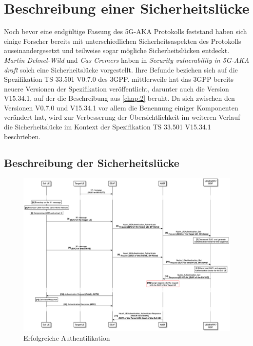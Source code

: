 \chapter{Beschreibung einer Sicherheitsl\"ucke}
\label{chap:4}

Noch bevor eine endgültige Fassung des 5G-AKA Protokolls feststand haben sich einige Forscher bereits mit unterschiedlichen Sicherheitsaspekten des Protokolls auseinandergesetzt und teilweise sogar mögliche Sicherheitslücken entdeckt.
\textit{Martin Dehnel-Wild} und \textit{Cas Cremers} haben in \textit{Security vulnerability in 5G-AKA draft} solch eine Sicherheitslücke vorgestellt. %
Ihre Befunde beziehen sich auf die Spezifikation TS 33.501 V0.7.0 des 3GPP. %
mittlerweile hat das 3GPP bereits neuere Versionen der Spezifikation veröffentlicht, darunter auch die Version V15.34.1, auf der die Beschreibung aus \cref{chap:2} beruht. %
Da sich zwischen den Versionen V0.7.0 und V15.34.1 vor allem die Benennung einiger Komponenten verändert hat, wird zur Verbesserung der Übersichtlichkeit im weiteren Verlauf die Sicherheitslücke im Kontext der Spezifikation TS 33.501 V15.34.1 beschrieben.


\section{Beschreibung der Sicherheitslücke}

\begin{figure}[H]
  \centering
  \includegraphics[width=\textwidth]{uml/vulnerability_v1.png}
  \caption{Erfolgreiche Authentifikation}
  \label{fig:protocol_v1}
\end{figure}

